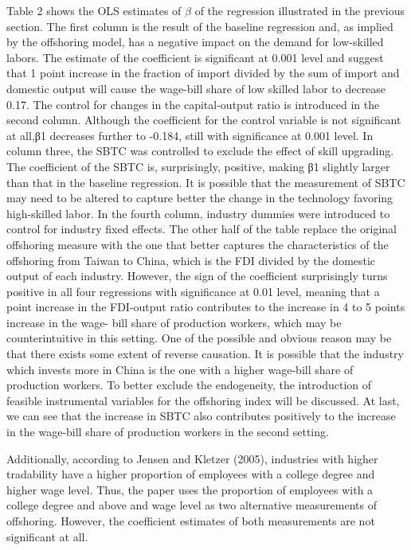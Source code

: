 \documentclass{article}
\begin{document}
Table 2 shows the OLS estimates of $\beta$ of the regression illustrated in the previous section. The first column is the result of the baseline regression and, as implied by the offshoring model, has a negative impact on the demand for low-skilled labors. The estimate of the coefficient is significant at 0.001 level and suggest that 1 point increase in the fraction of import divided by the sum of import and domestic output will cause the wage-bill share of low skilled labor to decrease 0.17. The control for changes in the capital-output ratio is introduced in the second column. Although the coefficient for the control variable is not significant at all,β1 decreases further to -0.184, still with significance at 0.001 level. In column three, the SBTC was controlled to exclude the effect of skill upgrading. The coefficient of the SBTC is, surprisingly, positive, making β1 slightly larger than that in the baseline regression. It is possible that the measurement of SBTC may need to be altered to capture better the change in the technology favoring high-skilled labor. In the fourth column, industry dummies were introduced to control for industry fixed effects. The other half of the table replace the original offshoring measure with the one that better captures the characteristics of the offshoring from Taiwan to China, which is the FDI divided by the domestic output of each industry. However, the sign of the coefficient surprisingly turns positive in all four regressions with significance at 0.01 level, meaning that a point increase in the FDI-output ratio contributes to the increase in 4 to 5 points increase in the wage- bill share of production workers, which may be counterintuitive in this setting. One of the possible and obvious reason may be that there exists some extent of reverse causation. It is possible that the industry which invests more in China is the one with a higher wage-bill share of production workers. To better exclude the endogeneity, the introduction of feasible instrumental variables for the offshoring index will be discussed. At last, we can see that the increase in SBTC also contributes positively to the increase in the wage-bill share of production workers in the second setting.\par
Additionally, according to Jensen and Kletzer (2005), industries with higher tradability have a higher proportion of employees with a college degree and higher wage level. Thus, the paper uses the proportion of employees with a college degree and above and wage level as two alternative measurements of offshoring. However, the coefficient estimates of both measurements are not significant at all. 
\end{document}
